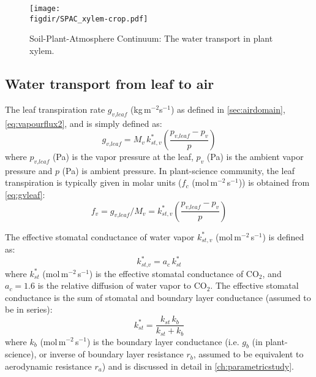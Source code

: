 \begin{figure}[t]
	\centering
	\texttt{[image: \\figdir/SPAC\_xylem-crop.pdf]}
	\caption{Soil-Plant-Atmosphere Continuum: The water transport in plant xylem.}
	\label{fig:SPAC_xylem}
\end{figure}


\subsection{Water transport from leaf to air}

The leaf transpiration rate $g_{\textit{v,leaf}}$ (kg\,m$^{-2}$s$^{-1}$) as defined in \cref{sec:airdomain}, \cref{eq:vapourflux2}, and is simply defined as:
\begin{equation}
g_{\textit{v,leaf}} = M_v\, k_{st,v}^* \left(\frac{p_{\textit{v,leaf}} - p_v}{p}\right)
\label{eq:gvleaf}
\end{equation}
where $p_{\textit{v,leaf}}$ (Pa) is the vapor pressure at the leaf, $p_v$ (Pa) is the ambient vapor pressure and $p$ (Pa) is ambient pressure. In plant-science community, the leaf transpiration is typically given in molar units ($f_c$ (mol\,m$^{-2}$\,s$^{-1}$)) is obtained from \cref{eq:gvleaf}:
\begin{equation}
f_v = g_{\textit{v,leaf}} / M_v = k_{st,v}^* \left(\frac{p_{\textit{v,leaf}} - p_v}{p}\right)
\label{eq:fvorig}
\end{equation}

The effective stomatal conductance of water vapor $k_{st,v}^*$ (mol\,m$^{-2}$\,s$^{-1}$) is defined as:
\begin{equation}
k_{\textit{st,v}}^* = a_c \,k_{\textit{st}}^*
\end{equation}
where $k_{\textit{st}}^*$ (mol\,m$^{-2}$\,s$^{-1}$) is the effective stomatal conductance of CO$_2$, and $a_c = 1.6$ is the relative diffusion of water vapor to CO$_2$. The effective stomatal conductance is the sum of stomatal and boundary layer conductance (assumed to be in series):
\begin{equation}
k_{\textit{st}}^* = \frac{k_{\textit{st}}\,k_b}{k_{\textit{st}} + k_b}
\end{equation}
where $k_b$ (mol\,m$^{-2}$\,s$^{-1}$) is the boundary layer conductance (i.e. $g_b$ (in plant-science), or inverse of boundary layer resistance $r_b$, assumed to be equivalent to aerodynamic resistance $r_a$) and is discussed in detail in \cref{ch:parametricstudy}.


